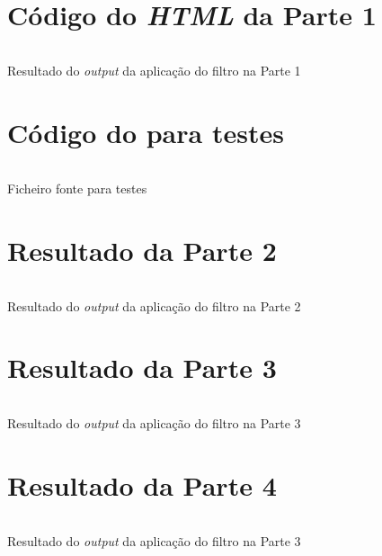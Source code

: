 \appendix

\chapter{Código do \emph{HTML} da Parte 1}
\label{appendix:a}

\begin{longlisting}
	\inputminted{html}{testes/res_html.html}
	\caption{Resultado do \emph{output} da aplicação do filtro na Parte 1}
	\label{listing:a}
\end{longlisting}


\chapter{Código do  para testes}
\label{appendix:a1}

\begin{longlisting}
	\inputminted{tex}{testes/ex3.bib}
	\caption{Ficheiro fonte  para testes}
	\label{listing:a1}
\end{longlisting}


\chapter{Resultado da Parte 2}
\label{appendix:b}

\begin{longlisting}
	\inputminted{tex}{testes/resNorm.bib}
	\caption{Resultado do \emph{output} da aplicação do filtro na Parte 2}

	\label{listing:b}
\end{longlisting}

\chapter{Resultado da Parte 3}
\label{appendix:c}

\begin{longlisting}
	\inputminted{tex}{testes/res_pretty_printing.txt}
	\caption{Resultado do \emph{output} da aplicação do filtro na Parte 3}

	\label{listing:c}
\end{longlisting}

\chapter{Resultado da Parte 4}
\label{appendix:d1}
\begin{longlisting}
	\inputminted{tex}{testes/res_dot.dot}
	\caption{Resultado do \emph{output} da aplicação do filtro na Parte 3}

	\label{listing:d1}
\end{longlisting}
\newpage

